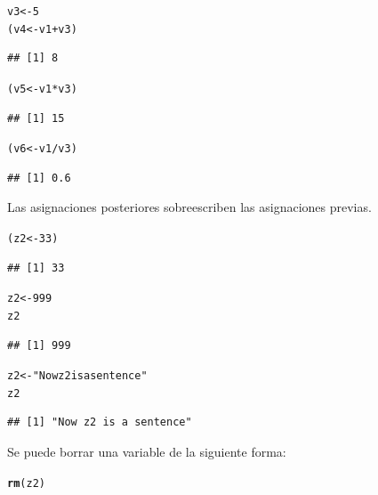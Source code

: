 \documentclass{config/apuntes}\usepackage[]{graphicx}\usepackage[]{xcolor}
\makeatletter
\newcommand{\hlnum}[1]{\textcolor[rgb]{0.686,0.059,0.569}{#1}}%
\newcommand{\hlsng}[1]{\textcolor[rgb]{0.192,0.494,0.8}{#1}}%
\newcommand{\hlopt}[1]{\textcolor[rgb]{0,0,0}{#1}}%
\newcommand{\hldef}[1]{\textcolor[rgb]{0.345,0.345,0.345}{#1}}%
\newcommand{\hlkwb}[1]{\textcolor[rgb]{0.69,0.353,0.396}{#1}}%
\newcommand{\hlkwd}[1]{\textcolor[rgb]{0.737,0.353,0.396}{\textbf{#1}}}%
\newenvironment{kframe}{%
 \def\at@end@of@kframe{}%
 \ifinner\ifhmode%
  \def\at@end@of@kframe{\end{minipage}}%
  \begin{minipage}{\columnwidth}%
 \fi\fi%
 \def\FrameCommand##1{\hskip\@totalleftmargin \hskip-\fboxsep
 \colorbox{shadecolor}{##1}\hskip-\fboxsep
     \hskip-\linewidth \hskip-\@totalleftmargin \hskip\columnwidth}%
 \MakeFramed {\advance\hsize-\width
   \@totalleftmargin\z@ \linewidth\hsize
   \@setminipage}}%
 {\par\unskip\endMakeFramed%
 \at@end@of@kframe}
\newenvironment{knitrout}{}{} %
\makeatother
\begin{document}
\begin{knitrout}
\color{fgcolor}\begin{kframe}
\begin{alltt}
\hldef{v3} \hlkwb{<-} \hlnum{5}
\hldef{(v4} \hlkwb{<-} \hldef{v1} \hlopt{+} \hldef{v3)}
\end{alltt}
\begin{verbatim}
## [1] 8
\end{verbatim}
\begin{alltt}
\hldef{(v5} \hlkwb{<-} \hldef{v1} \hlopt{*} \hldef{v3)}
\end{alltt}
\begin{verbatim}
## [1] 15
\end{verbatim}
\begin{alltt}
\hldef{(v6} \hlkwb{<-} \hldef{v1} \hlopt{/} \hldef{v3)}
\end{alltt}
\begin{verbatim}
## [1] 0.6
\end{verbatim}
\end{kframe}
\end{knitrout}

Las asignaciones posteriores sobreescriben las asignaciones previas.

\begin{knitrout}
\color{fgcolor}\begin{kframe}
\begin{alltt}
\hldef{(z2} \hlkwb{<-} \hlnum{33}\hldef{)}
\end{alltt}
\begin{verbatim}
## [1] 33
\end{verbatim}
\begin{alltt}
\hldef{z2} \hlkwb{<-} \hlnum{999}
\hldef{z2}
\end{alltt}
\begin{verbatim}
## [1] 999
\end{verbatim}
\begin{alltt}
\hldef{z2} \hlkwb{<-} \hlsng{"Now z2 is a sentence"}
\hldef{z2}
\end{alltt}
\begin{verbatim}
## [1] "Now z2 is a sentence"
\end{verbatim}
\end{kframe}
\end{knitrout}

Se puede borrar una variable de la siguiente forma:
\begin{knitrout}
\color{fgcolor}\begin{kframe}
\begin{alltt}
\hlkwd{rm}\hldef{(z2)}
\end{alltt}
\end{kframe}
\end{knitrout}
\end{document}

